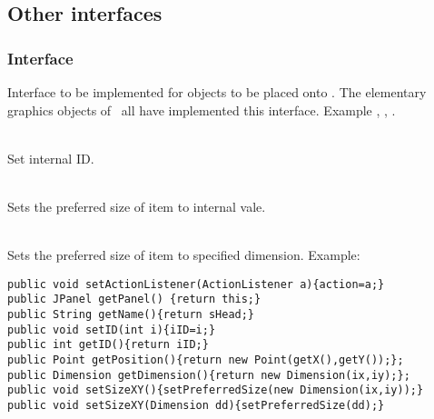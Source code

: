 \item {}
\item {}
\item {}
\item {}
\item {}
\item {}
\item {}
\item {}
\item {}
\item {}
\item {}
\item {}
\item {}
\item {}
\item {}
\item {}
\item {}
\ecir
\subsection{Other interfaces}
\subsubsection{Interface }
Interface to be implemented for objects to be placed onto .
The elementary graphics objects of \gui\ all have implemented this interface.
Example , , .
\bcir
\item {}
\item {}
\item {}
\item {}
\item {}
\item {}
\item {}\\
Set internal ID.
\item {}\\
Sets the preferred size of item to internal vale.
\item {}\\
Sets the preferred size of item to specified dimension.
\ecir
Example:
{\small \begin{verbatim}
public void setActionListener(ActionListener a){action=a;}
public JPanel getPanel() {return this;}
public String getName(){return sHead;}
public void setID(int i){iID=i;}
public int getID(){return iID;}
public Point getPosition(){return new Point(getX(),getY());};
public Dimension getDimension(){return new Dimension(ix,iy);};
public void setSizeXY(){setPreferredSize(new Dimension(ix,iy));}
public void setSizeXY(Dimension dd){setPreferredSize(dd);}
\end{verbatim}
}

